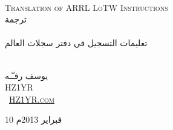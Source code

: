 \begin{titlepage}
\begin{center}

\thispagestyle{plain} %
	

\textsc{\LARGE \\ \textenglish{Translation of ARRL LoTW Instructions}}\\[1.5cm]

\textsc{\Large ترجمة}\\[0.5cm]

\HRule \\[0.4cm]
{ \huge تعليمات التسجيل في دفتر سجلات العالم}\\[0.4cm]

\HRule \\[1.5cm]

\begin{minipage}{0.65\textwidth}
\begin{flushright} \large
يوسف \textsc{رفـّـه \\ \textenglish{HZ1YR \\\
\href{http://www.HZ1YR.com}{\textenglish{{\small{HZ1YR.com}}}}}}
\end{flushright}
\end{minipage}

\vfill

{\large \textsc{10 فبراير 2013م}}
{\large \date{10 فبراير 2013م}}

\end{center}
\end{titlepage}